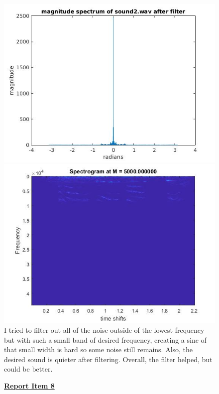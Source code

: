 \documentclass{article}
\begin{document}
\begin{figure}[H]
\includegraphics[scale = .5]{report7_3}
\includegraphics[scale = .5]{report7_4}
\\ I tried to filter out all of the noise outside of the lowest frequency but with such a small band of desired frequency, creating a sinc of that small width is hard so some noise still remains.
Also, the desired sound is quieter after filtering. Overall, the filter helped, but could be better.
\end{figure}

\begin{figure}[H]
  \color{red}
  \underline{\textbf{Report Item 8}}
  \color{black}


\end{figure}
\end{document}
